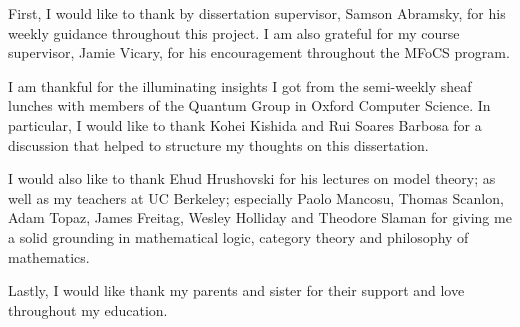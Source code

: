\begin{acknowledgements}
First, I would like to thank by dissertation supervisor, Samson Abramsky, for his weekly guidance throughout this project. I am also grateful for my course supervisor, Jamie Vicary, for his encouragement throughout the MFoCS program. 

I am thankful for the illuminating insights I got from the semi-weekly sheaf lunches with members of the Quantum Group in Oxford Computer Science. In particular, I would like to thank Kohei Kishida and Rui Soares Barbosa for a discussion that helped to structure my thoughts on this dissertation. 

I would also like to thank Ehud Hrushovski for his lectures on model theory; as well as my teachers at UC Berkeley; especially Paolo Mancosu, Thomas Scanlon, Adam Topaz, James Freitag, Wesley Holliday and Theodore Slaman for giving me a solid grounding in mathematical logic, category theory and philosophy of mathematics. 

Lastly, I would like thank my parents and sister for their support and love throughout my education.
\end{acknowledgements}

